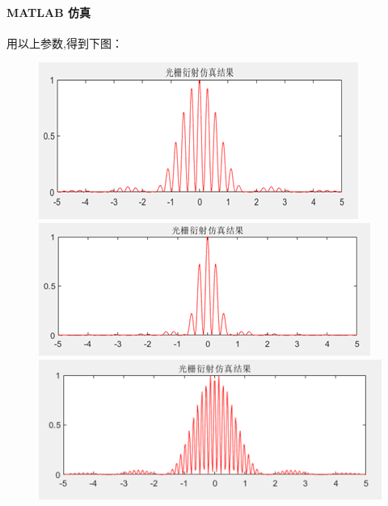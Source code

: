 \documentclass[a4paper]{../phyreport}
\begin{document}
\paragraph{MATLAB 仿真}用以上参数,得到下图：
\begin{figure}[H]
  \centering
  \begin{minipage}[b]{0.45\linewidth}
    \centering
    \includegraphics[width=0.9\linewidth]{fig/仿真/0.040.25.png}
  \end{minipage}
  \begin{minipage}[b]{0.45\linewidth}
    \centering
    \includegraphics[width=0.9\linewidth]{fig/仿真/0.080.25.png}
  \end{minipage}
  \begin{minipage}[b]{0.45\linewidth}
    \centering
    \includegraphics[width=0.9\linewidth]{fig/仿真/0.040.50.png}
  \end{minipage}

\end{figure}
\end{document}
